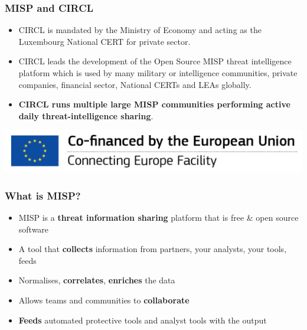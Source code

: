 \begin{frame}
\frametitle{MISP and CIRCL}
\begin{itemize}
\item CIRCL is mandated by the Ministry of Economy and acting as the Luxembourg National CERT for private sector.
\item CIRCL leads the development of the Open Source MISP threat intelligence platform which is used by many military or intelligence communities, private companies, financial sector, National CERTs and LEAs globally.
\item {\bf CIRCL runs multiple large MISP communities performing active daily threat-intelligence sharing}.
\end{itemize}
        \includegraphics{en_cef.png}
\end{frame}

\begin{frame}
\frametitle{What is MISP?}
\begin{itemize}
       \item MISP is a {\bf threat information sharing} platform that is free \& open source software
       \item A tool that {\bf collects} information from partners, your analysts, your tools, feeds
       \item Normalises, {\bf correlates}, {\bf enriches} the data
       \item Allows teams and communities to {\bf collaborate}
       \item {\bf Feeds} automated protective tools and analyst tools with the output
\end{itemize}
\end{frame}

